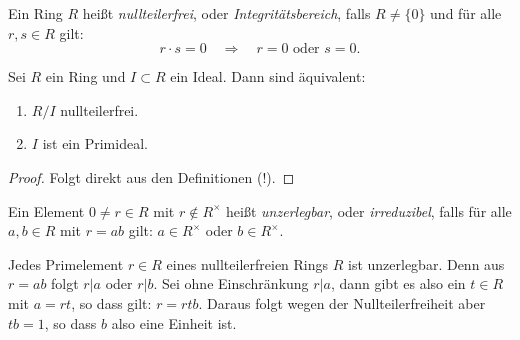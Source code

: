 \documentclass{book}
\begin{document}
\begin{defi}
    \label{defi:integraldomain}
    Ein Ring $R$ heißt \emph{nullteilerfrei}, oder \emph{Integritätsbereich}, falls $R \neq \{0\}$ und für alle
    $r,s \in R$ gilt:
    \[
        r \cdot s =0  \quad \Rightarrow \quad \text{$r = 0$ oder $s = 0$}.
    \]
\end{defi}

\begin{prop}
    \label{prop:nullteilerfreiprim}
    Sei $R$ ein Ring und $I \subset R$ ein Ideal. Dann sind äquivalent:
    \begin{enumerate}[label=(\roman*)]
        \item $R/I$ nullteilerfrei. 
        \item $I$ ist ein Primideal.
    \end{enumerate}
\end{prop}
\begin{proof}
    Folgt direkt aus den Definitionen (!).
\end{proof}

\begin{term}
    \label{term:unzerlegbar}
    Ein Element $0 \neq r \in R$ mit $r \notin R^{\times}$ heißt
    \emph{unzerlegbar}, oder \emph{irreduzibel}, falls für alle $a,b \in R$ mit
    $r = ab$ gilt: $a \in R^{\times}$ oder $b \in R^{\times}$.  
\end{term}

\begin{exa}
    \label{exa:primunzer}
    Jedes Primelement $r \in R$ eines nullteilerfreien Rings $R$ ist
    unzerlegbar. Denn aus $r = ab$ folgt $r | a$ oder $r | b$. Sei ohne
    Einschränkung $r|a$, dann gibt es also ein $t \in R$ mit $a = rt$, so dass
    gilt: $r = rtb$. Daraus folgt wegen der Nullteilerfreiheit aber $tb = 1$,
    so dass $b$ also eine Einheit ist. 
\end{exa}
\end{document}
